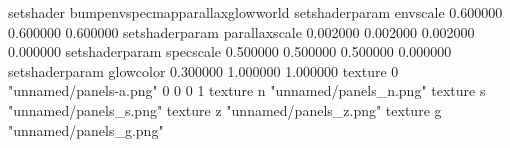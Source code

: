setshader bumpenvspecmapparallaxglowworld
setshaderparam envscale 0.600000 0.600000 0.600000
setshaderparam parallaxscale 0.002000 0.002000 0.002000 0.000000
setshaderparam specscale 0.500000 0.500000 0.500000 0.000000
setshaderparam glowcolor 0.300000 1.000000 1.000000
texture 0 "unnamed/panels-a.png" 0 0 0 1
texture n "unnamed/panels_n.png"
texture s "unnamed/panels_s.png"
texture z "unnamed/panels_z.png"
texture g "unnamed/panels_g.png"